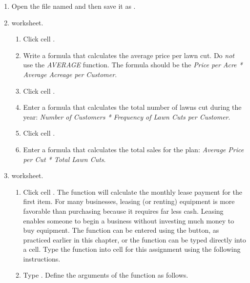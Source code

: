 \begin{enumbox}
	\begin{enumerate}
		\item Open the file named  and then save it as .
	
		\item {} worksheet.
	
		\begin{enumerate}
			\item Click cell .
		
			\item Write a formula that calculates the average price per lawn cut. Do \textit{not} use the \textit{AVERAGE} function. The formula should be the \textit{Price per Acre * Average Acreage per Customer}.
			
			\item Click cell .
			
			\item Enter a formula that calculates the total number of lawns cut during the year: \textit{Number of Customers * Frequency of Lawn Cuts per Customer}.
			
			\item Click cell .
			
			\item Enter a formula that calculates the total sales for the plan: \textit{Average Price per Cut * Total Lawn Cuts}.
		\end{enumerate}
		
		\item {} worksheet.
		
		\begin{enumerate}
			\item Click cell . The  function will calculate the monthly lease payment for the first item. For many businesses, leasing (or renting) equipment is more favorable than purchasing because it requires far less cash. Leasing enables someone to begin a business without investing much money to buy equipment. The  function can be entered using the  button, as practiced earlier in this chapter, or the  function can be typed directly into a cell. Type the function into cell  for this assignment using the following instructions.
			
			\item Type . Define the arguments of the function as follows.
		

\end{enumerate}
\end{enumerate}
\end{enumbox}
